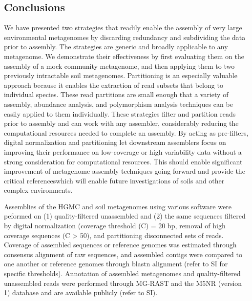 \documentclass{pnastwo}
\begin{document}
\begin{article}
\subsection{Conclusions}
We have presented two strategies that readily enable the assembly of very large
environmental metagenomes by discarding redundancy and subdividing the data
prior to assembly. The strategies are generic and broadly applicable to any
metagenome. We demonstrate their effectiveness by first evaluating them on the
assembly of a mock community metagenome, and then applying them to two
previously intractable soil metagenomes. Partitioning is an especially valuable
approach because it enables the extraction of read subsets that belong to
individual species. These read partitions are small enough that a variety of
assembly, abundance analysis, and polymorphism analysis techniques can be easily
applied to them individually. These strategies filter and partition reads prior
to assembly and can work with any assembler, considerably reducing the
computational resources needed to complete an assembly. By acting as
pre-filters, digital normalization and partitioning let downstream assemblers
focus on improving their performance on low-coverage or high variability data
without a strong consideration for computational resources. This should enable
significant improvement of metagenome assembly techniques going forward and
provide the critical referenceswhich will enable future investigations of soils
and other complex environments. \begin{materials} Assemblies of the HGMC and
soil metagenomes using various software were peformed on (1) quality-filtered
unassembled and (2) the same sequences filtered by digital normalization
(coverage threshold (C) = 20 bp, removal of high coverage sequences (C > 50), and partitioning disconnected sets
of reads. Coverage of assembled sequences or reference genomes was estimated
through consensus alignment of raw sequences, and assembled contigs were
compared to one another or reference genomes through blastn alignment (refer to
SI for specific thresholds). Annotation of assembled metagenomes and
quality-filtered unassembled reads were performed through MG-RAST and the M5NR
(version 1) database and are available publicly (refer to SI). \end{materials}



\end{article}
\end{document}
